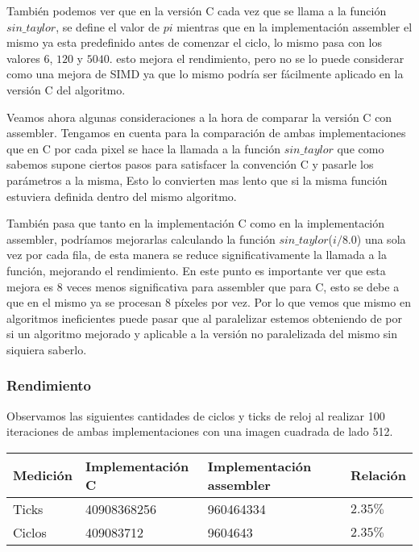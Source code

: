 También podemos ver que en la versión C cada vez que se llama a la función $sin\_taylor$, se define el valor de $pi$ mientras que en la implementación assembler el mismo ya esta predefinido antes de comenzar el ciclo, lo mismo pasa con los valores $6$, $120$ y $5040$. esto mejora el rendimiento, pero no se lo puede considerar como una mejora de SIMD ya que lo mismo podría ser fácilmente aplicado en la versión C del algoritmo.

Veamos ahora algunas consideraciones a la hora de comparar la versión C con assembler. Tengamos en cuenta para la comparación de ambas implementaciones que en C por cada pixel se hace la llamada a la función $sin\_taylor$ que como sabemos supone ciertos pasos para satisfacer la convención C y pasarle los parámetros a la misma, Esto lo convierten mas lento que si la misma función estuviera definida dentro del mismo algoritmo.

También pasa que tanto en la implementación C como en la implementación assembler, podríamos mejorarlas calculando la función $sin\_taylor$($i/8.0$) una sola vez por cada fila, de esta manera se reduce significativamente la llamada a la función, mejorando el rendimiento. En este punto es importante ver que esta mejora es $8$ veces menos significativa para assembler que para C, esto se debe a que en el mismo ya se procesan 8 píxeles por vez. Por lo que vemos que mismo en algoritmos ineficientes puede pasar que al paralelizar estemos obteniendo de por si un algoritmo mejorado y aplicable a la versión no paralelizada del mismo sin siquiera saberlo.


\subsubsection{Rendimiento}

Observamos las siguientes cantidades de ciclos y ticks de reloj al realizar 100 iteraciones de ambas implementaciones con una imagen cuadrada de lado 512.
\begin{center}
    \begin{tabular}{|l|l|l|l|}
        \hline
        Medición & Implementación C & Implementación assembler & Relación \\
        \hline
        Ticks    & 40908368256      & 960464334            & $2.35\%$ \\
        Ciclos   & 409083712        & 9604643              & $2.35\%$ \\
        \hline
    \end{tabular}
\end{center}